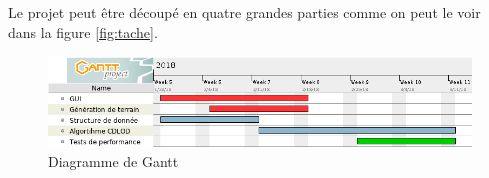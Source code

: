 \documentclass[12pt]{report}
\begin{document}
Le projet peut être découpé en quatre grandes parties comme on peut le voir dans la figure \ref{fig:tache}.\\


\begin{center}
\begin{figure}[!h]
  \includegraphics[scale=0.5]{img/gantt.png}
  \caption{Diagramme de Gantt}
  \label{fig:gantt}
\end{figure}
\end{center}

{}

\end{document}
